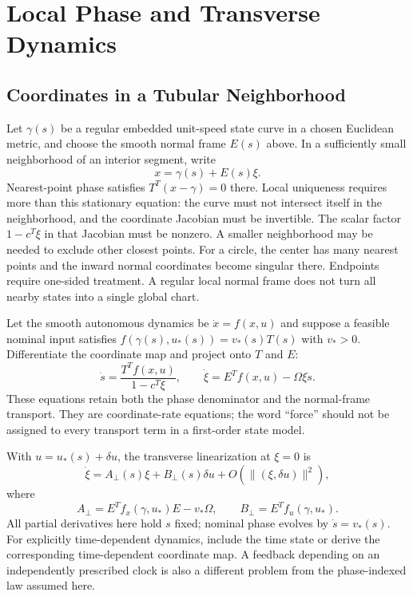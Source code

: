 \section{Local Phase and Transverse Dynamics}

\subsection{Coordinates in a Tubular Neighborhood}

Let $\gamma(s)$ be a regular embedded unit-speed state curve in a chosen
Euclidean metric, and choose the smooth normal frame $E(s)$ above. In a
sufficiently small neighborhood of an interior segment, write
\begin{equation}\label{eq:frenet_coords}
 x=\gamma(s)+E(s)\xi.
\end{equation}
Nearest-point phase satisfies $T^T(x-\gamma)=0$ there. Local uniqueness
requires more than this stationary equation: the curve must not intersect
itself in the neighborhood, and the coordinate Jacobian must be invertible.
The scalar factor $1-c^T\xi$ in that Jacobian must be nonzero. A smaller
neighborhood may be needed to exclude other closest points. For a circle,
the center has many nearest points and the inward normal coordinates become
singular there. Endpoints require one-sided treatment. A regular local
normal frame does not turn all nearby states into a single global chart.

Let the smooth autonomous dynamics be $\dot x=f(x,u)$ and suppose a feasible
nominal input satisfies
$f(\gamma(s),u_*(s))=v_*(s)T(s)$ with $v_*>0$. Differentiate the coordinate
map and project onto $T$ and $E$:
\begin{equation}\label{eq:curve_exact_transverse}
 \dot s=\frac{T^Tf(x,u)}{1-c^T\xi},\qquad
 \dot\xi=E^Tf(x,u)-\Omega\xi\dot s.
\end{equation}
These equations retain both the phase denominator and the normal-frame
transport. They are coordinate-rate equations; the word ``force'' should
not be assigned to every transport term in a first-order state model.

With $u=u_*(s)+\delta u$, the transverse linearization at $\xi=0$ is
\begin{equation}\label{eq:transverse_lin}
 \dot\xi=A_\perp(s)\xi+B_\perp(s)\delta u
 +O(\|(\xi,\delta u)\|^2),
\end{equation}
where
\begin{equation}
 A_\perp=E^Tf_x(\gamma,u_*)E-v_*\Omega,
 \qquad B_\perp=E^Tf_u(\gamma,u_*).
\end{equation}
All partial derivatives here hold $s$ fixed; nominal phase evolves by
$\dot s=v_*(s)$. For explicitly time-dependent dynamics, include the time
state or derive the corresponding time-dependent coordinate map. A
feedback depending on an independently prescribed clock is also a different
problem from the phase-indexed law assumed here.

